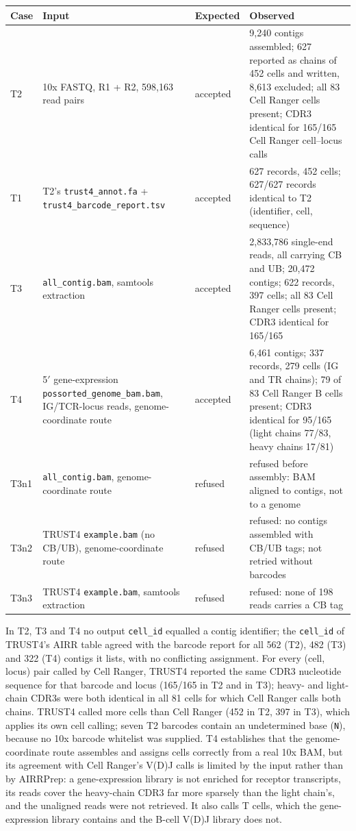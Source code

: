 \documentclass[11pt]{article}
\begin{document}
\begin{center}
\small
\begin{tabular}{p{}p{}p{}p{}}
\toprule
\textbf{Case} & \textbf{Input} & \textbf{Expected} & \textbf{Observed} \\
\midrule
T2 & 10x FASTQ, R1 + R2, 598,163 read pairs & accepted & 9,240 contigs assembled; 627 reported as chains of 452 cells and written, 8,613 excluded; all 83 Cell Ranger cells present; CDR3 identical for 165/165 Cell Ranger cell--locus calls \\
T1 & T2's \texttt{trust4\_annot.fa} + \texttt{trust4\_barcode\_report.tsv} & accepted & 627 records, 452 cells; 627/627 records identical to T2 (identifier, cell, sequence) \\
T3 & \texttt{all\_contig.bam}, samtools extraction & accepted & 2,833,786 single-end reads, all carrying CB and UB; 20,472 contigs; 622 records, 397 cells; all 83 Cell Ranger cells present; CDR3 identical for 165/165 \\
T4 & 5$'$ gene-expression \texttt{possorted\_genome\_bam.bam}, IG/TCR-locus reads, genome-coordinate route & accepted & 6,461 contigs; 337 records, 279 cells (IG and TR chains); 79 of 83 Cell Ranger B cells present; CDR3 identical for 95/165 (light chains 77/83, heavy chains 17/81) \\
T3n1 & \texttt{all\_contig.bam}, genome-coordinate route & refused & refused before assembly: BAM aligned to contigs, not to a genome \\
T3n2 & TRUST4 \texttt{example.bam} (no CB/UB), genome-coordinate route & refused & refused: no contigs assembled with CB/UB tags; not retried without barcodes \\
T3n3 & TRUST4 \texttt{example.bam}, samtools extraction & refused & refused: none of 198 reads carries a CB tag \\
\bottomrule
\end{tabular}
\end{center}

In T2, T3 and T4 no output \texttt{cell\_id} equalled a contig identifier; the
\texttt{cell\_id} of TRUST4's AIRR table agreed with the barcode report for all
562 (T2), 482 (T3) and 322 (T4) contigs it lists, with no conflicting
assignment. For
every (cell, locus) pair called by Cell Ranger, TRUST4 reported the same CDR3
nucleotide sequence for that barcode and locus (165/165 in T2 and in T3); heavy-
and light-chain CDR3s were both identical in all 81 cells for which Cell Ranger
calls both chains. TRUST4 called more cells than Cell Ranger (452 in T2, 397 in
T3), which applies its own cell calling; seven T2 barcodes contain an
undetermined base (\texttt{N}), because no 10x barcode whitelist was supplied.
T4 establishes that the genome-coordinate route assembles and assigns cells
correctly from a real 10x BAM, but its agreement with Cell Ranger's V(D)J calls
is limited by the input rather than by AIRRPrep: a gene-expression library is
not enriched for receptor transcripts, its reads cover the heavy-chain CDR3 far
more sparsely than the light chain's, and the unaligned reads were not
retrieved. It also calls T cells, which the gene-expression library contains
and the B-cell V(D)J library does not.
\end{document}
